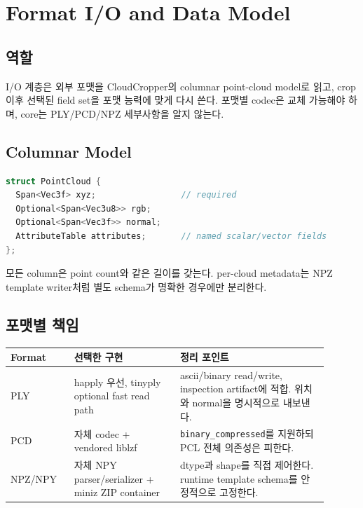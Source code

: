 \chapter{Format I/O and Data Model}

\section{역할}

I/O 계층은 외부 포맷을 CloudCropper의 columnar point-cloud model로 읽고,
crop 이후 선택된 field set을 포맷 능력에 맞게 다시 쓴다. 포맷별 codec은
교체 가능해야 하며, core는 PLY/PCD/NPZ 세부사항을 알지 않는다.

\section{Columnar Model}

\begin{lstlisting}[language=C++]
struct PointCloud {
  Span<Vec3f> xyz;                 // required
  Optional<Span<Vec3u8>> rgb;
  Optional<Span<Vec3f>> normal;
  AttributeTable attributes;       // named scalar/vector fields
};
\end{lstlisting}

모든 column은 point count와 같은 길이를 갖는다. per-cloud metadata는 NPZ
template writer처럼 별도 schema가 명확한 경우에만 분리한다.

\section{포맷별 책임}

\begin{longtable}{p{0.18\linewidth}p{0.30\linewidth}p{0.42\linewidth}}
\toprule
\textbf{Format} & \textbf{선택한 구현} & \textbf{정리 포인트} \\
\midrule
PLY & happly 우선, tinyply optional fast read path & ascii/binary read/write,
inspection artifact에 적합. 위치와 normal을 명시적으로 내보낸다. \\
PCD & 자체 codec + vendored liblzf & \texttt{binary\_compressed}를 지원하되
PCL 전체 의존성은 피한다. \\
NPZ/NPY & 자체 NPY parser/serializer + miniz ZIP container & dtype과 shape를
직접 제어한다. runtime template schema를 안정적으로 고정한다. \\
\bottomrule
\end{longtable}

